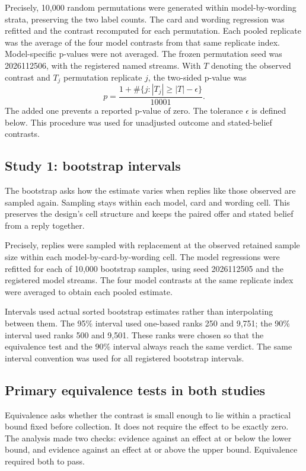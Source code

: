Precisely, 10,000 random permutations were generated within model-by-wording strata, preserving the two label counts. The card and wording regression was refitted and the contrast recomputed for each permutation. Each pooled replicate was the average of the four model contrasts from that same replicate index. Model-specific p-values were not averaged. The frozen permutation seed was 2026112506, with the registered named streams. With $T$ denoting the observed contrast and $T_j$ permutation replicate $j$, the two-sided p-value was
\[
 p=\frac{1+\#\{j:|T_j|\geq |T|-\epsilon\}}{10001}.
\]
The added one prevents a reported p-value of zero. The tolerance $\epsilon$ is defined below. This procedure was used for unadjusted outcome and stated-belief contrasts.

\subsection{Study 1: bootstrap intervals}
\label{subapp:study-1-bootstrap-intervals}
The bootstrap asks how the estimate varies when replies like those observed are sampled again. Sampling stays within each model, card and wording cell. This preserves the design's cell structure and keeps the paired offer and stated belief from a reply together.

Precisely, replies were sampled with replacement at the observed retained sample size within each model-by-card-by-wording cell. The model regressions were refitted for each of 10,000 bootstrap samples, using seed 2026112505 and the registered model streams. The four model contrasts at the same replicate index were averaged to obtain each pooled estimate.

Intervals used actual sorted bootstrap estimates rather than interpolating between them. The 95\% interval used one-based ranks 250 and 9,751; the 90\% interval used ranks 500 and 9,501. These ranks were chosen so that the equivalence test and the 90\% interval always reach the same verdict. The same interval convention was used for all registered bootstrap intervals.

\subsection{Primary equivalence tests in both studies}
\label{subapp:primary-equivalence-tests-in-both-studies}
Equivalence asks whether the contrast is small enough to lie within a practical bound fixed before collection. It does not require the effect to be exactly zero. The analysis made two checks: evidence against an effect at or below the lower bound, and evidence against an effect at or above the upper bound. Equivalence required both to pass.

